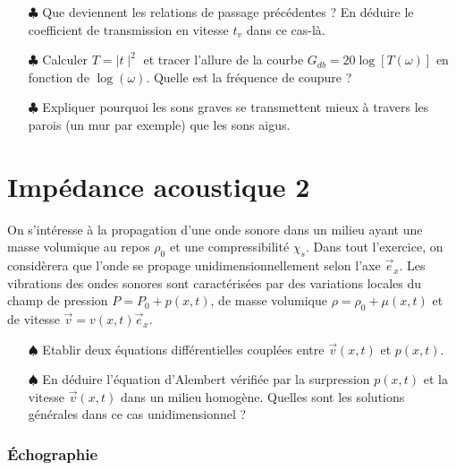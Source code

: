 \documentclass{report}
\begin{document}
\begin{itemize}
	
	\item[$\clubsuit$] Que deviennent les relations de passage précédentes ? En déduire le coefficient de transmission en vitesse $t_v$ dans ce cas-là. 
	
	\item[$\clubsuit$] Calculer $T=\mid t\mid^2$ et tracer l'allure de la courbe $G_{db}=20\log\left[T(\omega) \right]$ en fonction de $\log(\omega)$. Quelle est la fréquence de coupure ?
	
	\item[$\clubsuit$] Expliquer pourquoi les sons graves se transmettent mieux à travers les parois (un mur par exemple) que les sons aigus.
	
\end{itemize}

\newpage

\newpage

\section*{Impédance acoustique 2}

On s'intéresse à la propagation d'une onde sonore dans un milieu ayant une masse volumique au repos $\rho_0$ et une compressibilité $\chi_s$. Dans tout l'exercice, on considèrera que l'onde se propage unidimensionnellement selon l'axe $\vec{e}_x$. Les vibrations des ondes sonores sont caractérisées par des variations locales du champ de pression $P = P_0 + p(x,t)$, de masse volumique $\rho=\rho_0 + \mu(x,t)$ et de vitesse $\vec{v}=v(x,t)\vec{e}_x$. 

\begin{itemize}

	\item[$\spadesuit$] Etablir deux équations différentielles couplées entre $\vec{v}(x,t)$ et $p(x,t)$.
	
	\item[$\spadesuit$] En déduire l'équation d'Alembert vérifiée par la surpression $p(x,t)$ et la vitesse $\vec{v}(x,t)$ dans un milieu homogène. Quelles sont les solutions générales dans ce cas unidimensionnel ? 

\end{itemize}	
	
\subsubsection*{Échographie}
\end{document}
